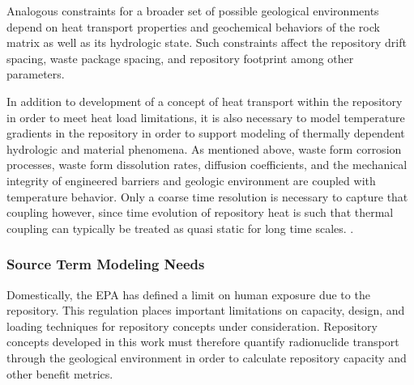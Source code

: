 Analogous constraints for a broader set of possible geological environments 
depend on heat transport properties and geochemical behaviors of the rock matrix 
as well as its hydrologic state.  Such constraints affect the  
repository drift spacing, waste package spacing, and repository footprint among 
other parameters. 


In addition to development of a concept of heat transport within the repository 
in order to meet heat load limitations, it is also necessary to model 
temperature gradients in the repository in  order to support modeling of 
thermally dependent hydrologic and material phenomena.  As mentioned above, 
waste form corrosion processes, waste form
dissolution rates, diffusion coefficients, and the mechanical integrity of 
engineered barriers and geologic environment are coupled with temperature 
behavior. 
Only a coarse time resolution is necessary to capture that coupling 
however, since time evolution of repository heat is
such that thermal coupling can typically be treated as quasi static for long 
time scales.
\cite{andra_argile:_2005}. %

\subsubsection{Source Term Modeling Needs}

Domestically, the \gls{EPA} has defined a limit on  human 
exposure due to the repository. This regulation places important limitations on 
capacity, design, and loading techniques for repository concepts under 
consideration. Repository concepts developed in this work must therefore 
quantify radionuclide transport through the geological environment in order to 
calculate repository capacity and other benefit metrics. 

